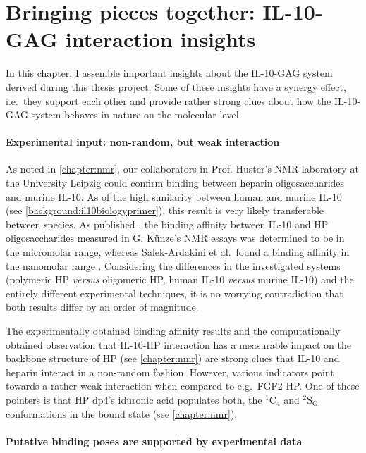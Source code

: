 \chapter{Bringing pieces together: IL-10-GAG interaction insights}

In this chapter, I assemble important insights about the IL-10-GAG system
derived during this thesis project. Some of these insights have a synergy
effect, i.e.\ they support each other and provide rather strong clues about how
the IL-10-GAG system behaves in nature on the molecular level.


\subsubsection{Experimental input: non-random, but weak interaction}

As noted in \cref{chapter:nmr}, our collaborators in Prof. Huster's NMR
laboratory at the University Leipzig could confirm binding between heparin
oligosaccharides and murine IL-10. As of the high similarity between human and
murine IL-10 (see \cref{background:il10biologyprimer}), this result is very
likely transferable between species. As published \cite{kuenze_gehrcke_2014},
the binding affinity between IL-10 and HP oligosaccharides measured in G.
Künze's NMR essays was determined to be in the micromolar range, whereas
Salek-Ardakini et al.\ found a binding affinity in the nanomolar range
\cite{salek_ardakani_2000}. Considering the differences in the investigated
systems (polymeric HP \textit{versus} oligomeric HP, human IL-10 \textit{versus}
murine IL-10) and the entirely different experimental techniques, it is no
worrying contradiction that both results differ by an order of magnitude.

The experimentally obtained binding affinity results and the computationally
obtained observation that IL-10-HP interaction has a measurable impact on the
backbone structure of HP (see \cref{chapter:nmr}) are strong clues that IL-10
and heparin interact in a non-random fashion. However, various indicators point
towards a rather weak interaction when compared to e.g.\ FGF2-HP. One of these
pointers is that HP dp4's iduronic acid populates both, the ${}^1$C${}_4$ and
${}^2$S${}_\mathrm{O}$ conformations in the bound state (see
\cref{chapter:nmr}).


\subsubsection{Putative binding poses are supported by experimental data}

